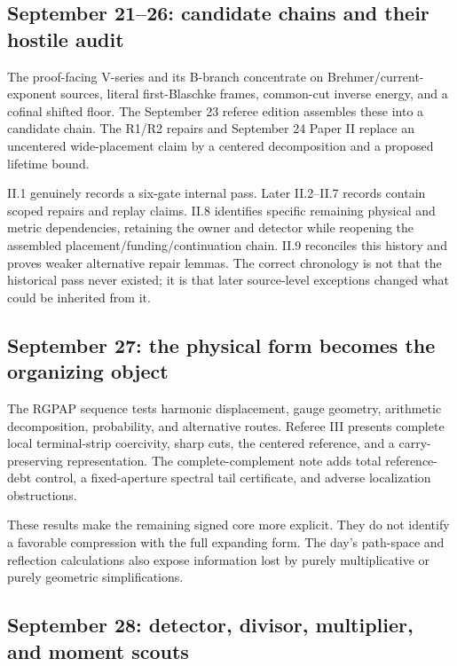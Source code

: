\documentclass[
  10pt,
  a4paper,
  10pt,
  oneside,
  openany]{book}
\begin{document}
\subsection{September 21--26: candidate chains and their hostile
audit}\label{september-2126-candidate-chains-and-their-hostile-audit}

The proof-facing V-series and its B-branch concentrate on
Brehmer/current-exponent sources, literal first-Blaschke frames,
common-cut inverse energy, and a cofinal shifted floor. The September 23
referee edition assembles these into a candidate chain. The R1/R2
repairs and September 24 Paper II replace an uncentered wide-placement
claim by a centered decomposition and a proposed lifetime bound.

II.1 genuinely records a six-gate internal pass. Later II.2--II.7
records contain scoped repairs and replay claims. II.8 identifies
specific remaining physical and metric dependencies, retaining the owner
and detector while reopening the assembled
placement/funding/continuation chain. II.9 reconciles this history and
proves weaker alternative repair lemmas. The correct chronology is not
that the historical pass never existed; it is that later source-level
exceptions changed what could be inherited from it.

\subsection{September 27: the physical form becomes the organizing
object}\label{september-27-the-physical-form-becomes-the-organizing-object}

The RGPAP sequence tests harmonic displacement, gauge geometry,
arithmetic decomposition, probability, and alternative routes. Referee
III presents complete local terminal-strip coercivity, sharp cuts, the
centered reference, and a carry-preserving representation. The
complete-complement note adds total reference-debt control, a
fixed-aperture spectral tail certificate, and adverse localization
obstructions.

These results make the remaining signed core more explicit. They do not
identify a favorable compression with the full expanding form. The day's
path-space and reflection calculations also expose information lost by
purely multiplicative or purely geometric simplifications.

\subsection{September 28: detector, divisor, multiplier, and moment
scouts}\label{september-28-detector-divisor-multiplier-and-moment-scouts}
\end{document}
